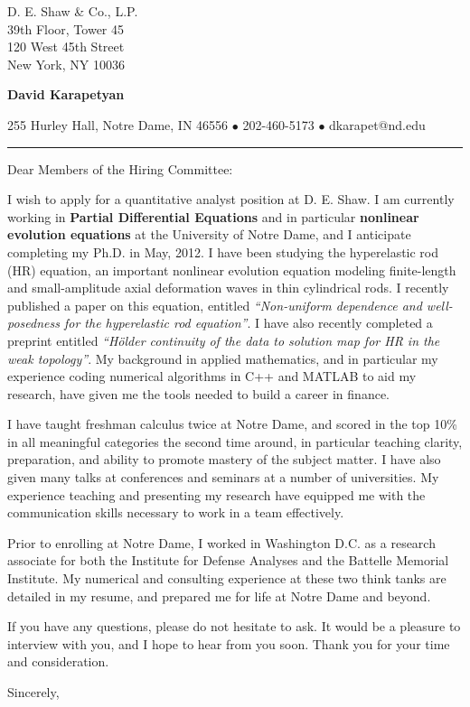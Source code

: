 \documentclass[12pt]{letter}
\date{\vspace{0.5cm}\flushleft \today}
\begin{document}
\begin{letter}{D. E. Shaw \& Co., L.P. \\
39th Floor, Tower 45 \\
120 West 45th Street \\
New York, NY 10036
}
    \begin{center}
{\bf {\Large David Karapetyan}}
\end{center}

\begin{center}
{255 Hurley Hall, Notre Dame, IN 46556  $\bullet$
202-460-5173 $\bullet$ dkarapet@nd.edu
}
\end{center}
\hrule

\opening{Dear Members of the Hiring Committee:\\}
%
%
I wish to apply for a quantitative analyst position at D. E. Shaw. I am
currently working in \textbf{Partial Differential Equations} and in particular
\textbf{nonlinear evolution equations} at the University of Notre Dame, and I
anticipate completing my Ph.D.  in May, 2012. I have been studying the
hyperelastic rod (HR) equation, an important nonlinear evolution equation
modeling finite-length and small-amplitude axial deformation waves in thin
cylindrical rods. I recently published a paper on this equation, entitled {\it
``Non-uniform dependence and well-posedness for the hyperelastic rod
equation''}. I have also recently completed a preprint entitled {\it ``H\"older
continuity of the data to solution map for HR in the weak topology''}. My
background in applied mathematics, and in particular my experience coding
numerical algorithms in C++ and MATLAB to aid my research, have given me the
tools needed to build a career in finance.

I have taught freshman calculus twice at Notre Dame, and scored in the top 10\%
in all meaningful categories the second time around, in particular teaching
clarity, preparation, and ability to promote mastery of the subject matter. I
have also given many talks at conferences and seminars at a number of
universities. My experience teaching and presenting my research have equipped
me with the communication skills necessary to work in a team effectively. 

Prior to enrolling at Notre Dame, I worked in Washington D.C. as a research
associate for both the Institute for Defense Analyses and the Battelle Memorial
Institute. My numerical and consulting experience at these two think tanks are
detailed in my resume, and prepared me for life at Notre Dame and beyond. 

If you have any questions, please do not hesitate to ask. It would be a pleasure to
interview with you, and I hope to hear from you soon. Thank you for your time
and consideration. 

\closing{Sincerely,}


\end{letter}
\end{document}
